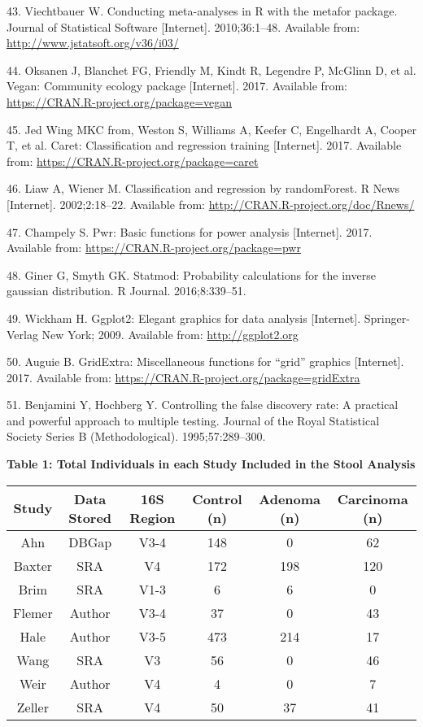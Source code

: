 \documentclass[12pt,]{article}
\begin{document}
\hypertarget{ref-metafor_citation_2010}{}
43. Viechtbauer W. Conducting meta-analyses in R with the metafor
package. Journal of Statistical Software {[}Internet{]}. 2010;36:1--48.
Available from: \url{http://www.jstatsoft.org/v36/i03/}

\hypertarget{ref-vegan_citation_2017}{}
44. Oksanen J, Blanchet FG, Friendly M, Kindt R, Legendre P, McGlinn D,
et al. Vegan: Community ecology package {[}Internet{]}. 2017. Available
from: \url{https://CRAN.R-project.org/package=vegan}

\hypertarget{ref-caret_citation_2017}{}
45. Jed Wing MKC from, Weston S, Williams A, Keefer C, Engelhardt A,
Cooper T, et al. Caret: Classification and regression training
{[}Internet{]}. 2017. Available from:
\url{https://CRAN.R-project.org/package=caret}

\hypertarget{ref-randomforest_citation_2002}{}
46. Liaw A, Wiener M. Classification and regression by randomForest. R
News {[}Internet{]}. 2002;2:18--22. Available from:
\url{http://CRAN.R-project.org/doc/Rnews/}

\hypertarget{ref-pwr_citation_2017}{}
47. Champely S. Pwr: Basic functions for power analysis {[}Internet{]}.
2017. Available from: \url{https://CRAN.R-project.org/package=pwr}

\hypertarget{ref-statmod_citation_2016}{}
48. Giner G, Smyth GK. Statmod: Probability calculations for the inverse
gaussian distribution. R Journal. 2016;8:339--51.

\hypertarget{ref-ggplot2_citation_2009}{}
49. Wickham H. Ggplot2: Elegant graphics for data analysis
{[}Internet{]}. Springer-Verlag New York; 2009. Available from:
\url{http://ggplot2.org}

\hypertarget{ref-gridextra_citation_2017}{}
50. Auguie B. GridExtra: Miscellaneous functions for ``grid'' graphics
{[}Internet{]}. 2017. Available from:
\url{https://CRAN.R-project.org/package=gridExtra}

\hypertarget{ref-benjamini_controlling_1995}{}
51. Benjamini Y, Hochberg Y. Controlling the false discovery rate: A
practical and powerful approach to multiple testing. Journal of the
Royal Statistical Society Series B (Methodological). 1995;57:289--300.

\newpage

\textbf{Table 1: Total Individuals in each Study Included in the Stool
Analysis}

\footnotesize

\begin{longtable}[]{@{}cccccc@{}}
\toprule
Study & Data Stored & 16S Region & Control (n) & Adenoma (n) & Carcinoma
(n)\tabularnewline
\midrule
\endhead
Ahn & DBGap & V3-4 & 148 & 0 & 62\tabularnewline
Baxter & SRA & V4 & 172 & 198 & 120\tabularnewline
Brim & SRA & V1-3 & 6 & 6 & 0\tabularnewline
Flemer & Author & V3-4 & 37 & 0 & 43\tabularnewline
Hale & Author & V3-5 & 473 & 214 & 17\tabularnewline
Wang & SRA & V3 & 56 & 0 & 46\tabularnewline
Weir & Author & V4 & 4 & 0 & 7\tabularnewline
Zeller & SRA & V4 & 50 & 37 & 41\tabularnewline
\bottomrule
\end{longtable}
\end{document}
